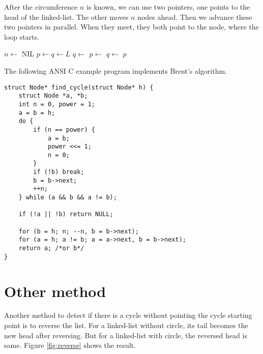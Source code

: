 \documentclass{article}
\begin{document}
After the circumference $n$ is known, we can use two pointers, one points to the head
of the linked-list. The other moves $n$ nodes ahead. Then we advance these two pointers
in parallel. When they meet, they both point to the node, where the loop starts.

\begin{algorithmic}[1]
  \State $n \gets$ 
    \State \Return NIL
  \EndIf
  \State $p \gets q \gets L$
    \State $q \gets$ 
  \EndLoop
    \State $p \gets$ 
    \State $q \gets$ 
  \EndWhile
  \State \Return $p$ 
\EndFunction
\end{algorithmic}

The following ANSI C example program implements Brent's algorithm.

\lstset{language=C}
\begin{lstlisting}
struct Node* find_cycle(struct Node* h) {
    struct Node *a, *b;
    int n = 0, power = 1;
    a = b = h;
    do {
        if (n == power) {
            a = b;
            power <<= 1;
            n = 0;
        }
        if (!b) break;
        b = b->next;
        ++n;
    } while (a && b && a != b);

    if (!a || !b) return NULL;

    for (b = h; n; --n, b = b->next);
    for (a = h; a != b; a = a->next, b = b->next);
    return a; /*or b*/
}
\end{lstlisting}

\section{Other method}
Another method to detect if there is a cycle without pointing the cycle starting point is to reverse
the list. For a linked-list without circle, its tail becomes the new head after reversing. But
for a linked-list with circle, the reversed head is same. Figure \ref{fig:reverse} shows the result.
\end{document}
